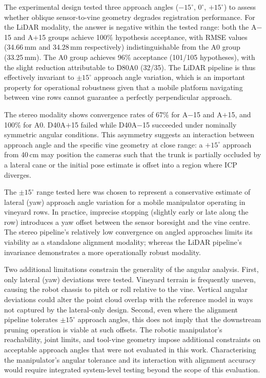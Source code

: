 The experimental design tested three approach angles ($-15^{\circ}$, $0^{\circ}$, $+15^{\circ}$) to assess whether oblique sensor-to-vine geometry degrades registration performance. For the LiDAR modality, the answer is negative within the tested range: both the A$-$15 and A$+$15 groups achieve 100\% hypothesis acceptance, with RMSE values (34.66\,mm and 34.28\,mm respectively) indistinguishable from the A0 group (33.25\,mm). The A0 group achieves 96\% acceptance (101/105 hypotheses), with the slight reduction attributable to D80A0 (32/35). The LiDAR pipeline is thus effectively invariant to $\pm 15^{\circ}$ approach angle variation, which is an important property for operational robustness given that a mobile platform navigating between vine rows cannot guarantee a perfectly perpendicular approach.

The stereo modality shows convergence rates of 67\% for A$-$15 and A$+$15, and 100\% for A0. D40A$+$15 failed while D40A$-$15 succeeded under nominally symmetric angular conditions. This asymmetry suggests an interaction between approach angle and the specific vine geometry at close range: a $+15^{\circ}$ approach from 40\,cm may position the cameras such that the trunk is partially occluded by a lateral cane or the initial pose estimate is offset into a region where ICP diverges.

The $\pm 15^{\circ}$ range tested here was chosen to represent a conservative estimate of lateral (yaw) approach angle variation for a mobile manipulator operating in vineyard rows. In practice, imprecise stopping (slightly early or late along the row) introduces a yaw offset between the sensor boresight and the vine centre. The stereo pipeline's relatively low convergence on angled approaches limits its viability as a standalone alignment modality; whereas the LiDAR pipeline's invariance demonstrates a more operationally robust modality.

Two additional limitations constrain the generality of the angular analysis. First, only lateral (yaw) deviations were tested. Vineyard terrain is frequently uneven, causing the robot chassis to pitch or roll relative to the vine. Vertical angular deviations could alter the point cloud overlap with the reference model in ways not captured by the lateral-only design. Second, even where the alignment pipeline tolerates $\pm 15^{\circ}$ approach angles, this does not imply that the downstream pruning operation is viable at such offsets. The robotic manipulator's reachability, joint limits, and tool-vine geometry impose additional constraints on acceptable approach angles that were not evaluated in this work. Characterising the manipulator's angular tolerance and its interaction with alignment accuracy would require integrated system-level testing beyond the scope of this evaluation.

